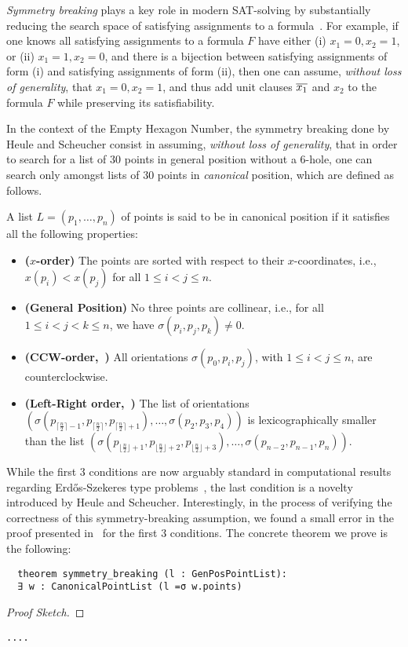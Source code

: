 \emph{Symmetry breaking} plays a key role in modern SAT-solving by substantially reducing the search space of satisfying assignments to a formula~\cite{biereHandbookSatisfiabilityVolume2009}. For example, if one knows all satisfying assignments to a formula $F$ have either (i) $x_1 = 0, x_2 = 1$, or  (ii) $x_1 = 1, x_2 = 0$, and there is a bijection between satisfying assignments of form (i) and satisfying assignments of form (ii), then one can assume, \emph{without loss of generality}, that $x_1 = 0, x_2 = 1$, and thus add unit clauses $\overline{x_1}$ and $x_2$ to the formula $F$ while preserving its satisfiability. 

In the context of the Empty Hexagon Number, the symmetry breaking done by Heule and Scheucher consist in assuming, \emph{without loss of generality}, that in order to search for a list of $30$ points in general position without a $6$-hole, one can search only amongst lists of $30$ points in \emph{canonical} position, which are defined as follows.   
\begin{definition}
A list $L = (p_1,\ldots, p_{n})$ of points is said to be in canonical position if it satisfies all the following properties:
\begin{itemize}
    \item \textbf{($x$-order)} The points are sorted with respect to their $x$-coordinates, i.e., $x(p_i) < x(p_j)$ for all $1 \leq i < j \leq n$.
    \item \textbf{(General Position)} No three points are collinear, i.e., for all $1 \leq i < j < k \leq n$, we have $\sigma(p_i, p_j, p_k) \neq 0$. 
    \item \textbf{(CCW-order,~)} All orientations $\sigma(p_0, p_i, p_j)$, with $1 \leq i < j \leq n$, are counterclockwise.
    \item \textbf{(Left-Right order,~)} The list of orientations $\left(\sigma\left(p_{\lceil \frac{n}{2} \rceil -1}, p_{\lceil \frac{n}{2} \rceil},p_{\lceil \frac{n}{2} \rceil+1}\right), \ldots, \sigma\left(p_2, p_3, p_4\right) \right)$ is lexicographically smaller than the list $\left(\sigma\left(p_{\lfloor \frac{n}{2} \rfloor  + 1}, p_{\lfloor \frac{n}{2} \rfloor+2},p_{\lfloor \frac{n}{2} \rfloor+3}\right), \ldots, \sigma\left(p_{n-2}, p_{n-1}, p_{n}\right) \right)$.
\end{itemize}
\end{definition}
    While the first 3 conditions are now arguably standard in computational results regarding Erd\H{o}s-Szekeres type problems~\cite{scheucherTwoDisjoint5holes2020}, the last condition is a novelty introduced by Heule and Scheucher.
    Interestingly, in the process of verifying the correctness of this symmetry-breaking assumption, we found a small error in the proof presented in~\cite{scheucherTwoDisjoint5holes2020} for the first $3$ conditions. 
The concrete theorem we prove is the following:

\begin{lstlisting}
  theorem symmetry_breaking (l : GenPosPointList):
  ∃ w : CanonicalPointList (l =σ w.points)
\end{lstlisting}
  

\begin{proof}[Proof Sketch]
\end{proof}


\begin{lstlisting}
....

\end{lstlisting}